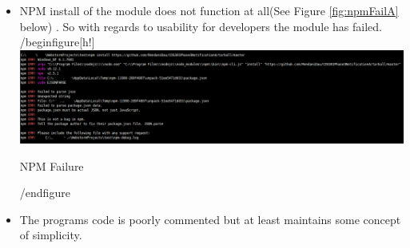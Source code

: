 \begin{itemize}
	\item NPM install of the module does not function at all(See Figure \ref{fig:npmFailA} below) . So with regards to usability for developers the module has failed.
	/begin{figure}[h!]
		\includegraphics[width=\linewidth]{../images/npmfail.png}
		\caption{NPM Failure}
		\label{fig:npmFailA}
	/end{figure}
	\item The programs code is poorly commented but at least maintains some concept of simplicity.
\end{itemize}
